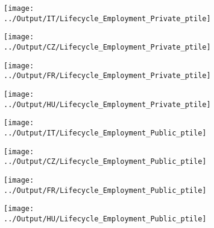 \documentclass[12pt,notitlepage]{article}
\begin{document}
\begin{figure}[!htpb]
\centering
\caption{Employment level (Percentile - Private)}
\begin{subfigure}{.49\textwidth}
    \centering
 \texttt{[image: ../Output/IT/Lifecycle\_Employment\_Private\_ptile]}
\end{subfigure}%
\begin{subfigure}{.49\textwidth}
    \centering
 \texttt{[image: ../Output/CZ/Lifecycle\_Employment\_Private\_ptile]}
\end{subfigure}
\begin{subfigure}{.49\textwidth}
    \centering
 \texttt{[image: ../Output/FR/Lifecycle\_Employment\_Private\_ptile]}
\end{subfigure}%
\begin{subfigure}{.49\textwidth}
    \centering
 \texttt{[image: ../Output/HU/Lifecycle\_Employment\_Private\_ptile]}
\end{subfigure}
\end{figure}
\pagebreak

\begin{figure}[!htpb]
\centering
\caption{Employment level (Percentile - Public)}
\begin{subfigure}{.49\textwidth}
    \centering
 \texttt{[image: ../Output/IT/Lifecycle\_Employment\_Public\_ptile]}
\end{subfigure}%
\begin{subfigure}{.49\textwidth}
    \centering
 \texttt{[image: ../Output/CZ/Lifecycle\_Employment\_Public\_ptile]}
\end{subfigure}
\begin{subfigure}{.49\textwidth}
    \centering
 \texttt{[image: ../Output/FR/Lifecycle\_Employment\_Public\_ptile]}
\end{subfigure}%
\begin{subfigure}{.49\textwidth}
    \centering
 \texttt{[image: ../Output/HU/Lifecycle\_Employment\_Public\_ptile]}
\end{subfigure}
\end{figure}
\pagebreak
\end{document}
